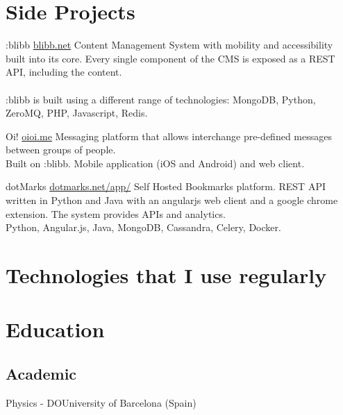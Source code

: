 \documentclass[10pt, a4paper]{moderncv}
\begin{document}
\cvline{}{}

\section{Side Projects}


\cvline{}{}

{:blibb}
{}{}{\url{blibb.net}}
{Content Management System with mobility and accessibility built into its core. Every single component of the CMS is exposed as a REST API, including the content.\\\\ :blibb is built using a different range of technologies: MongoDB, Python, ZeroMQ, PHP, Javascript, Redis.}

\cvline{}{}

{Oi!}
{}{}{\url{oioi.me}}
{Messaging platform that allows interchange pre-defined messages between groups of people.\\Built on :blibb. Mobile application (iOS and Android) and web client.}

\cvline{}{}

{dotMarks}
{}{}{\url{dotmarks.net/app/}}
{Self Hosted Bookmarks platform. REST API written in Python and Java with an angularjs web client and a google chrome extension. The system provides APIs and analytics.\\Python, Angular.js, Java, MongoDB, Cassandra, Celery, Docker.}

\cvline{}{}

%
%

\section{Technologies that I use regularly}

\cvline{}{}


\cvline{}{}

%
%

\section{Education}
\subsection{Academic}
{Physics - DO}{University of Barcelona (Spain)}{}{}{}
\end{document}
